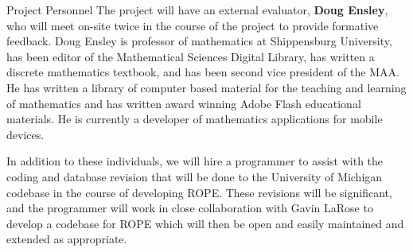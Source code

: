 \documentclass[11pt]{article}
\begin{document}
\begin{section}{Project Personnel}
The project will have an external evaluator, \textbf{Doug Ensley}, who
will meet on-site twice in the course of the project to provide formative
feedback.  Doug Ensley is professor of mathematics at Shippensburg
University, has been editor of the Mathematical Sciences Digital Library,
has written a discrete mathematics textbook, and has been second vice
president of the MAA.  He has written a library of computer based material
for the teaching and learning of mathematics and has written award winning
Adobe Flash educational materials.  He is currently a developer of
mathematics applications for mobile devices.

In addition to these individuals, we will hire a programmer to assist with
the coding and database revision that will be done to the University of
Michigan codebase in the course of developing ROPE. These revisions
will be significant, and the programmer will work in close collaboration
with Gavin LaRose to develop a codebase for ROPE which will then be
open and easily maintained and extended as appropriate. 

\end{section}
\end{document}
